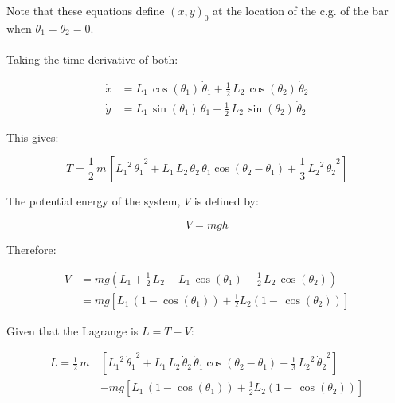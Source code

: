 \documentclass[12pt, letterpaper]{../assignment}
\begin{document}
Note that these equations define $(x,y)_0$ at the location of the c.g. of the bar when $\theta_1 = \theta_2 = 0$.
\\\\

Taking the time derivative of both:

\begin{equation*}
    \begin{aligned}
    \dot{x} &= L_{1}\,\cos\left(\theta _{1}\right)\,\dot{\theta} _{1}+\frac{1}{2}\,L_{2}\,\cos\left(\theta _{2}\right)\,\dot{\theta} _{2} \\
    \dot{y} &= L_{1}\,\sin\left(\theta _{1}\right)\,\dot{\theta} _{1}+\frac{1}{2}\,L_{2}\,\sin\left(\theta _{2}\right)\,\dot{\theta} _{2}
    \end{aligned}
\end{equation*}

This gives:

$$ T = \frac{1}{2}\,m\,\left[{L_{1}}^2\,{\dot{\theta} _{1}}^2
+L_{1}\,L_{2}\,\dot{\theta} _{2}\,\dot{\theta} _{1}\cos\left(\theta _{2}-\theta _{1}\right)
+\frac{1}{3}\,{L_{2}}^2\,{\dot{\theta} _{2}}^2\right] $$

The potential energy of the system, $V$ is defined by:

$$ V = mgh $$

Therefore:

\begin{equation*}
    \begin{aligned}
    V &= m g \left(L_{1}+\frac{1}{2}\,L_{2}-L_{1}\,\cos\left(\theta _{1}\right)-\frac{1}{2}\,L_{2}\,\cos\left(\theta _{2}\right)\right) \\
    &= m g \left[L_{1}\,\left(1-\cos\left(\theta _{1}\right)\right)+\frac{1}{2} L_{2}\left(1-\,\cos\left(\theta _{2}\right)\right)\right]
    \end{aligned}
\end{equation*}


Given that the Lagrange is $ L = T - V $:

\begin{answer}
\begin{equation*}
\begin{aligned}
            L = \frac{1}{2}\,m\,&\left[{L_{1}}^2\,{\dot{\theta} _{1}}^2
+L_{1}\,L_{2}\,\dot{\theta} _{2}\,\dot{\theta} _{1}\cos\left(\theta _{2}-\theta _{1}\right)
+\frac{1}{3}\,{L_{2}}^2\,{\dot{\theta} _{2}}^2\right]\\
&- m g \left[L_{1}\,\left(1-\cos\left(\theta _{1}\right)\right)+\frac{1}{2} L_{2}\left(1-\,\cos\left(\theta _{2}\right)\right)\right]
\end{aligned}
\end{equation*}
\end{answer}
\end{document}
